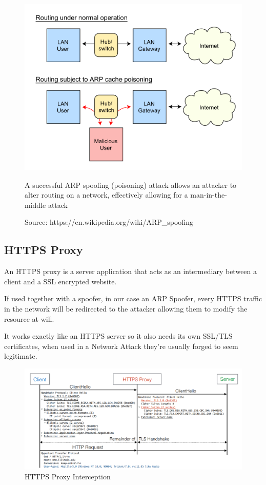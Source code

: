\begin{figure}[h!]
 \centering
 \includegraphics[width=13cm]{img/ARP_Spoofing.png}
 \caption{A successful ARP spoofing (poisoning) attack allows an attacker to alter routing on a network, effectively allowing for a man-in-the-middle attack}
 \caption*{Source: https://en.wikipedia.org/wiki/ARP\_spoofing}
 \label{fig: ARP Spoofing}
\end{figure}

\newpage

\subsection{HTTPS Proxy}

An HTTPS proxy is a server application that acts as an intermediary between a client and a SSL encrypted website.

If used together with a spoofer, in our case an ARP Spoofer, every HTTPS traffic in the network will be redirected to the attacker allowing them to modify the resource at will.

It works exactly like an HTTPS server so it also needs its own SSL/TLS certificates, when used in a Network Attack they're usually forged to seem legitimate.

\begin{figure}[h!]
 \centering
 \includegraphics[width=13cm]{img/https_proxy_interception.png}
 \caption{HTTPS Proxy Interception\protect\cite{https-interception}}
 \label{fig: HTTPS Proxy Interception}
\end{figure}



